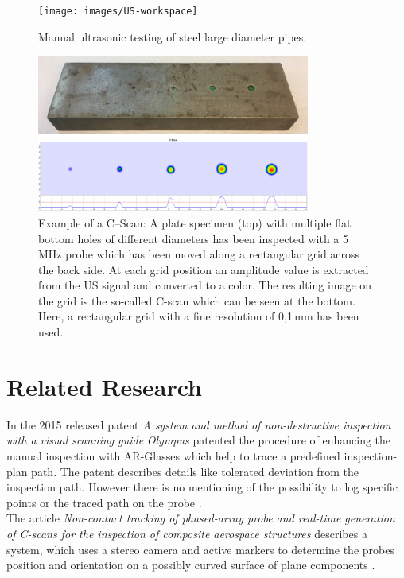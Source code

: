 \documentclass{VRARWorkshop}
\begin{document}
\begin{figure}[h!]
    \begin{center}
        \texttt{[image: images/US-workspace]}
        \caption{\label{fig:manual_UT} Manual ultrasonic testing of steel large diameter pipes.}
    \end{center}
\end{figure}
\begin{figure}[h!]
    \begin{center}
        \includegraphics[width=0.8\textwidth]{images/CScan}
        \caption{\label{fig:cScan} Example of a C--Scan: A plate specimen (top) with multiple flat bottom holes of different diameters has been inspected with a 5 MHz probe which has been moved along a rectangular grid across the back side. At each grid position an amplitude value is extracted from the US signal and converted to a color. The resulting image on the grid is the so-called C-scan which can be seen at the bottom.
				Here, a rectangular grid with a fine resolution of 0,1\,mm has been used.}
    \end{center}
\end{figure}

\section{Related Research}
In the 2015 released patent \textit{A system and method of non-destructive inspection with a visual scanning guide} \textit{Olympus} patented the procedure of enhancing the manual inspection with AR-Glasses which help to trace a predefined inspection-plan path.
The patent describes details like tolerated deviation from the inspection path.
However there is no mentioning of the possibility to log specific points or the traced path on the probe \cite{ARPat15}.\\

The article \textit{Non-contact tracking of phased-array probe and real-time generation of C-scans for the inspection of composite aerospace structures} describes a system, which uses a stereo camera and active markers to determine the probes position and orientation on a possibly curved surface of plane components \cite{walter_non-contact_2007}.\\
\end{document}
